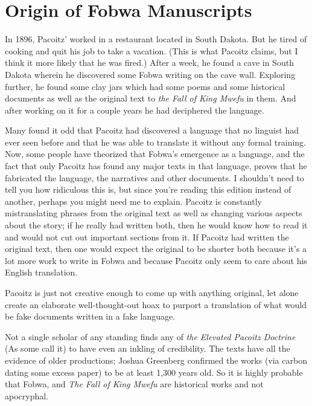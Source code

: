 \chapter{Origin of Fobwa Manuscripts}
In 1896, Pa\-co\-itz' worked in a restaurant located in South Dakota. But he tired of cooking and quit his job to take a vacation. (This is what Pa\-co\-itz claims, but I think it more likely that he was fired.) After a week, he found a cave in South Dakota wherein he discovered some Fobwa writing on the cave wall. Exploring further, he found some clay jars which had some poems and some historical documents as well as the original text to \emph{the Fall of King Mwe\-fu} in them. And after working on it for a couple years he had deciphered the language.

Many found it odd that Pa\-co\-itz had discovered a language that no linguist had ever seen before and that he was able to translate it without any formal training. Now, some people have theorized that Fobwa's emergence as a language, and the fact that only Pa\-co\-itz has found any major texts in that language, proves that he fabricated the language, the narratives and other documents. I shouldn't need to tell you how ridiculous this is, but since you're reading this edition instead of another, perhaps you might need me to explain. Pa\-co\-itz is constantly mistranslating phrases from the original text as well as changing various aspects about the story; if he really had written both, then he would know how to read it and would not cut out important sections from it. If Pa\-co\-itz had written the original text, then one would expect the original to be shorter both because it's a lot more work to write in Fobwa and because Pa\-co\-itz only seem to care about his English translation.

Pa\-co\-itz is just not creative enough to come up with anything original, let alone create an elaborate well-thought-out hoax to purport a translation of what would be fake documents written in a fake language.

Not a single scholar of any standing finds any of \emph{the Elevated Pa\-co\-itz Doctrine} (As some call it) to have even an inkling of credibility. The texts have all the evidence of older productions; Joshua Greenberg confirmed the works (via carbon dating some excess paper) to be at least 1,300 years old. So it is highly probable that Fobwa, and \emph{The Fall of King Mwe\-fu} are historical works and not apocryphal.


